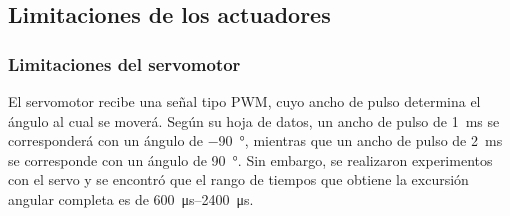 \subsection{Limitaciones de los actuadores}

\subsubsection{Limitaciones del servomotor}

El servomotor recibe una señal tipo PWM, cuyo ancho de pulso determina el ángulo al cual se moverá. Según su hoja de datos, un ancho de pulso de \qty{1}{\ms} se corresponderá con un ángulo de \qty{-90}{\degree}, mientras que un ancho de pulso de \qty{2}{\ms} se corresponde con un ángulo de \qty{90}{\degree}. Sin embargo, se realizaron experimentos con el servo y se encontró que el rango de tiempos que obtiene la excursión angular completa es de \qtyrange{600}{2400}{\us}.



